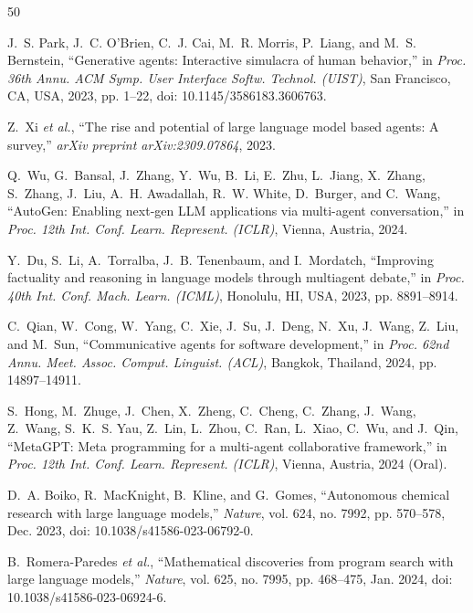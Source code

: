 \documentclass{ieeeaccess}
\begin{document}
\begin{thebibliography}{50}

J.~S. Park, J.~C. O'Brien, C.~J. Cai, M.~R. Morris, P.~Liang, and M.~S. Bernstein, ``Generative agents: Interactive simulacra of human behavior,'' in \emph{Proc. 36th Annu. ACM Symp. User Interface Softw. Technol. (UIST)}, San Francisco, CA, USA, 2023, pp. 1--22, doi: 10.1145/3586183.3606763.

Z.~Xi \emph{et al.}, ``The rise and potential of large language model based agents: A survey,'' \emph{arXiv preprint arXiv:2309.07864}, 2023.

Q.~Wu, G.~Bansal, J.~Zhang, Y.~Wu, B.~Li, E.~Zhu, L.~Jiang, X.~Zhang, S.~Zhang, J.~Liu, A.~H. Awadallah, R.~W. White, D.~Burger, and C.~Wang, ``AutoGen: Enabling next-gen LLM applications via multi-agent conversation,'' in \emph{Proc. 12th Int. Conf. Learn. Represent. (ICLR)}, Vienna, Austria, 2024.

Y.~Du, S.~Li, A.~Torralba, J.~B. Tenenbaum, and I.~Mordatch, ``Improving factuality and reasoning in language models through multiagent debate,'' in \emph{Proc. 40th Int. Conf. Mach. Learn. (ICML)}, Honolulu, HI, USA, 2023, pp. 8891--8914.

C.~Qian, W.~Cong, W.~Yang, C.~Xie, J.~Su, J.~Deng, N.~Xu, J.~Wang, Z.~Liu, and M.~Sun, ``Communicative agents for software development,'' in \emph{Proc. 62nd Annu. Meet. Assoc. Comput. Linguist. (ACL)}, Bangkok, Thailand, 2024, pp. 14897--14911.

S.~Hong, M.~Zhuge, J.~Chen, X.~Zheng, C.~Cheng, C.~Zhang, J.~Wang, Z.~Wang, S.~K.~S. Yau, Z.~Lin, L.~Zhou, C.~Ran, L.~Xiao, C.~Wu, and J.~Qin, ``MetaGPT: Meta programming for a multi-agent collaborative framework,'' in \emph{Proc. 12th Int. Conf. Learn. Represent. (ICLR)}, Vienna, Austria, 2024 (Oral).

D.~A. Boiko, R.~MacKnight, B.~Kline, and G.~Gomes, ``Autonomous chemical research with large language models,'' \emph{Nature}, vol. 624, no. 7992, pp. 570--578, Dec. 2023, doi: 10.1038/s41586-023-06792-0.

B.~Romera-Paredes \emph{et al.}, ``Mathematical discoveries from program search with large language models,'' \emph{Nature}, vol. 625, no. 7995, pp. 468--475, Jan. 2024, doi: 10.1038/s41586-023-06924-6.


\end{thebibliography}
\end{document}
